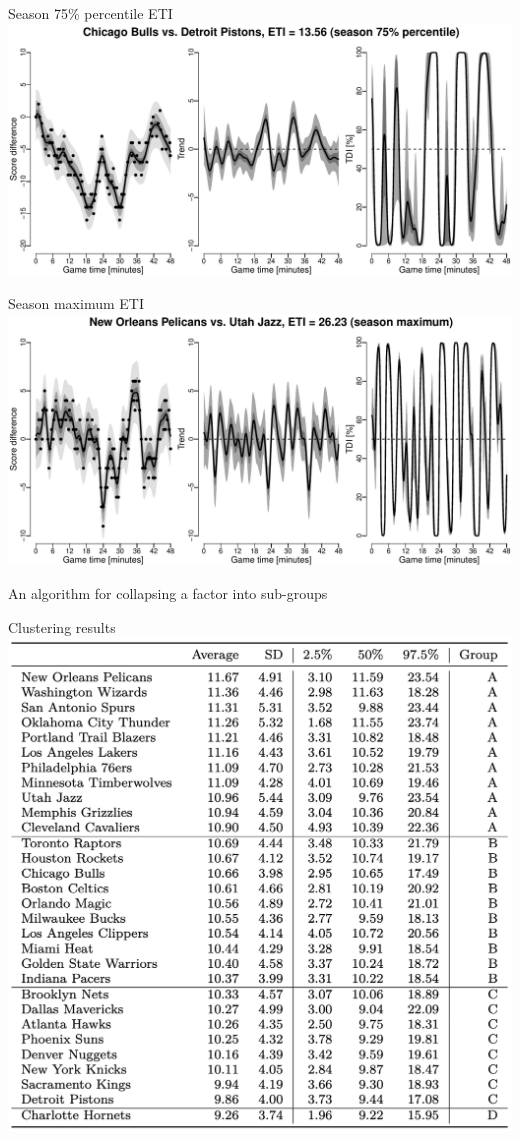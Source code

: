 \documentclass[ignorenonframetext,xcolor=pdflatex,table,dvipsnames,serif]{beamer}
\begin{document}
\begin{frame}{Season 75\% percentile ETI}
\includegraphics[scale=0.5]{fig4_4.pdf}
\end{frame}

\begin{frame}{Season maximum ETI}
\includegraphics[scale=0.5]{fig4_5.pdf}
\end{frame}



\begin{frame}{An algorithm for collapsing a factor into sub-groups}
\end{frame}


\begin{frame}{Clustering results}
\center\includegraphics[scale=0.4]{tab1.png}
\end{frame}
\end{document}

